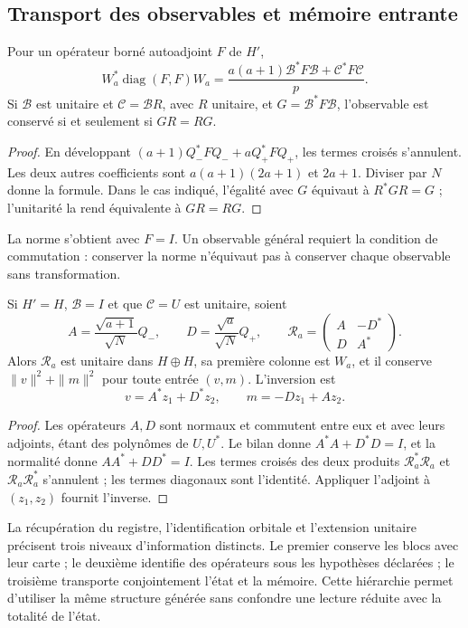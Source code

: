 \subsection{Transport des observables et mémoire entrante}
\label{v:subsec:acoplamiento-lectores}

\begin{theorem}
\label{v:thm:acoplamiento-lector}
Pour un opérateur borné autoadjoint \(F\) de \(H'\),
\[
 W_a^*\operatorname{diag}(F,F)W_a
 =\frac{a(a+1)\mathcal B^*F\mathcal B+\mathcal C^*F\mathcal C}{p}.
\]
Si \(\mathcal B\) est unitaire et \(\mathcal C=\mathcal BR\), avec
\(R\) unitaire, et \(G=\mathcal B^*F\mathcal B\), l’observable est
conservé si et seulement si \(GR=RG\).
\end{theorem}
\begin{proof}
En développant \((a+1)Q_-^*FQ_-+aQ_+^*FQ_+\), les termes croisés
s’annulent. Les deux autres coefficients sont
\(a(a+1)(2a+1)\) et \(2a+1\). Diviser par \(N\) donne la formule.
Dans le cas indiqué, l’égalité avec \(G\) équivaut à \(R^*GR=G\) ;
l’unitarité la rend équivalente à \(GR=RG\).
\end{proof}

La norme s’obtient avec \(F=I\). Un observable général requiert
la condition de commutation : conserver la norme n’équivaut pas à conserver
chaque observable sans transformation.

\begin{theorem}
\label{v:thm:acoplamiento-memoria}
Si \(H'=H\), \(\mathcal B=I\) et que \(\mathcal C=U\) est unitaire, soient
\[
 A=\frac{\sqrt{a+1}}{\sqrt N}Q_-,\qquad
 D=\frac{\sqrt a}{\sqrt N}Q_+,\qquad
 \mathscr R_a=\begin{pmatrix}A&-D^*\\D&A^*\end{pmatrix}.
\]
Alors \(\mathscr R_a\) est unitaire dans \(H\oplus H\), sa première
colonne est \(W_a\), et il conserve \(\|v\|^2+\|m\|^2\) pour toute
entrée \((v,m)\). L’inversion est
\[
 v=A^*z_1+D^*z_2,\qquad m=-Dz_1+Az_2.
\]
\end{theorem}
\begin{proof}
Les opérateurs \(A,D\) sont normaux et commutent entre eux et avec leurs
adjoints, étant des polynômes de \(U,U^*\). Le bilan donne
\(A^*A+D^*D=I\), et la normalité donne \(AA^*+DD^*=I\).
Les termes croisés des deux produits
\(\mathscr R_a^*\mathscr R_a\) et \(\mathscr R_a\mathscr R_a^*\)
s’annulent ; les termes diagonaux sont l’identité. Appliquer l’adjoint à
\((z_1,z_2)\) fournit l’inverse.
\end{proof}

La récupération du registre, l’identification orbitale et l’extension
unitaire précisent trois niveaux d’information distincts. Le premier
conserve les blocs avec leur carte ; le deuxième identifie des opérateurs sous
les hypothèses déclarées ; le troisième transporte conjointement l’état et la
mémoire. Cette hiérarchie permet d’utiliser la même structure générée sans
confondre une lecture réduite avec la totalité de l’état.
